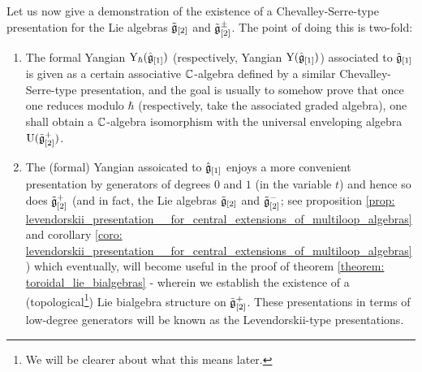         Let us now give a demonstration of the existence of a Chevalley-Serre-type presentation for the Lie algebras $\tilde{\mathfrak{g}}_{[2]}$ and $\tilde{\mathfrak{g}}_{[2]}^{\pm}$. The point of doing this is two-fold:
        \begin{enumerate}
            \item The formal Yangian $\mathrm{Y}_{\hbar}(\hat{\mathfrak{g}}_{[1]})$ (respectively, Yangian $\mathrm{Y}(\hat{\mathfrak{g}}_{[1]})$) associated to $\hat{\mathfrak{g}}_{[1]}$ is given as a certain associative $\mathbb{C}$-algebra defined by a similar Chevalley-Serre-type presentation, and the goal is usually to somehow prove that once one reduces modulo $\hbar$ (respectively, take the associated graded algebra), one shall obtain a $\mathbb{C}$-algebra isomorphism with the universal enveloping algebra $\mathrm{U}(\tilde{\mathfrak{g}}_{[2]}^+)$.
            \item The (formal) Yangian assoicated to $\hat{\mathfrak{g}}_{[1]}$ enjoys a more convenient presentation by generators of degrees $0$ and $1$ (in the variable $t$) and hence so does $\tilde{\mathfrak{g}}_{[2]}^+$ (and in fact, the Lie algebras $\tilde{\mathfrak{g}}_{[2]}$ and $\tilde{\mathfrak{g}}_{[2]}^-$; see proposition \ref{prop: levendorskii_presentation__for_central_extensions_of_multiloop_algebras} and corollary \ref{coro: levendorskii_presentation__for_central_extensions_of_multiloop_algebras}) which eventually, will become useful in the proof of theorem \ref{theorem: toroidal_lie_bialgebras} - wherein we establish the existence of a (topological\footnote{We will be clearer about what this means later.}) Lie bialgebra structure on $\tilde{\mathfrak{g}}_{[2]}^+$. These presentations in terms of low-degree generators will be known as the Levendorskii-type presentations.
        \end{enumerate}
        

